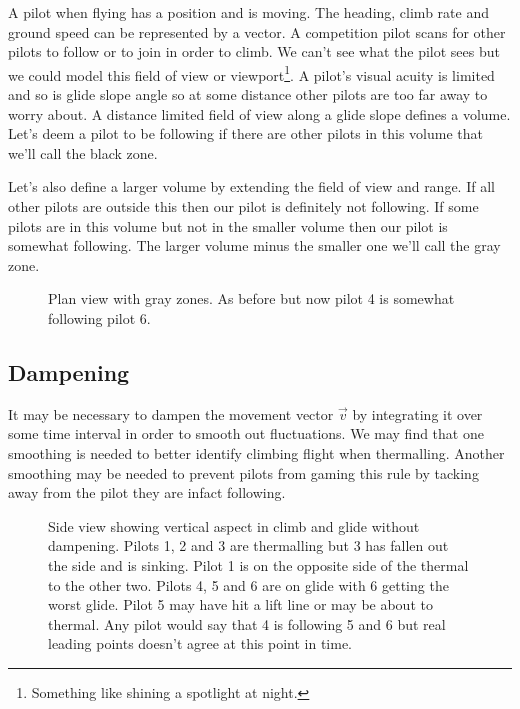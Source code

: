 \documentclass[gap.tex]{subfiles}
\begin{document}
A pilot when flying has a position and is moving. The heading, climb rate and
ground speed can be represented by a vector. A competition pilot scans for
other pilots to follow or to join in order to climb. We can't see what the
pilot sees but we could model this field of view or viewport\footnote{Something
like shining a spotlight at night.}. A pilot's visual acuity is limited and so
is glide slope angle so at some distance other pilots are too far away to worry
about. A distance limited field of view along a glide slope defines a volume.
Let's deem a pilot to be following if there are other pilots in this volume
that we'll call the black zone.

Let's also define a larger volume by extending the field of view and range. If
all other pilots are outside this then our pilot is definitely not following.
If some pilots are in this volume but not in the smaller volume then our pilot
is somewhat following. The larger volume minus the smaller one we'll call the
gray zone.

\begin{figure}[ht]
    \centering
    
    \caption{Plan view with gray zones. As before but now pilot 4 is somewhat following pilot 6.}
    \label{fig:view-port-zones}
\end{figure}

\subsection{Dampening}
It may be necessary to dampen the movement vector \(\vec{v}\) by integrating it
over some time interval in order to smooth out fluctuations. We may find that
one smoothing is needed to better identify climbing flight when thermalling.
Another smoothing may be needed to prevent pilots from gaming this rule by
tacking away from the pilot they are infact following.

\begin{figure}[ht]
    \centering
    
    \caption{Side view showing vertical aspect in climb and glide without dampening. Pilots 1, 2 and 3 are thermalling but 3 has fallen out the side and is sinking. Pilot 1 is on the opposite side of the thermal to the other two. Pilots 4, 5 and 6 are on glide with 6 getting the worst glide. Pilot 5 may have hit a lift line or may be about to thermal. Any pilot would say that 4 is following 5 and 6 but real leading points doesn't agree at this point in time.}
    \label{fig:view-port-side}
\end{figure}
\end{document}

